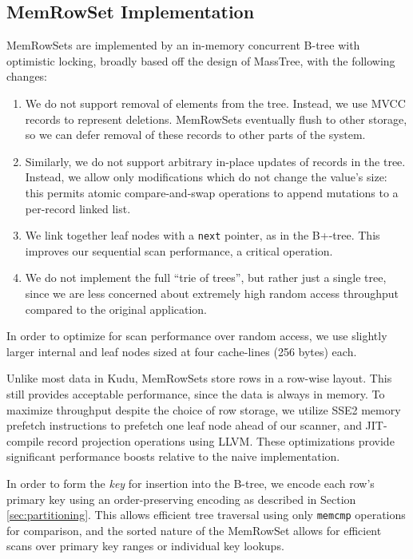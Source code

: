 \documentclass[twocolumn,9pt]{article}
\begin{document}
\subsection{MemRowSet Implementation}

MemRowSets are implemented by an in-memory concurrent B-tree with optimistic
locking, broadly based off the design of MassTree\cite{masstree}, with the following
changes:
\begin{enumerate}
\item We do not support removal of elements from the tree. Instead, we use MVCC
  records to represent deletions. MemRowSets eventually flush to other storage,
  so we can defer removal of these records to other parts of the system.
\item Similarly, we do not support arbitrary in-place updates of records in the tree.
  Instead, we allow only modifications which do not change the value's size:
  this permits atomic compare-and-swap operations to append mutations to a
  per-record linked list.
\item We link together leaf nodes with a {\tt next} pointer, as in the B+-tree\cite{bplus_tree}.
  This improves our sequential scan performance, a critical operation.
\item We do not implement the full ``trie of trees'', but rather just a single
  tree, since we are less concerned about extremely high random access throughput
  compared to the original application.
\end{enumerate}

In order to optimize for scan performance over random access, we use slightly larger internal and
leaf nodes sized at four cache-lines (256 bytes) each.

Unlike most data in Kudu, MemRowSets store rows in a row-wise layout. This still
provides acceptable performance, since the data is always in memory. To maximize
throughput despite the choice of row storage, we utilize
SSE2 memory prefetch instructions to prefetch one leaf node ahead of our scanner,
and JIT-compile record projection operations using LLVM\cite{llvm}.
These optimizations provide significant performance boosts relative to the
naive implementation.

In order to form the {\em key} for insertion into the B-tree, we encode
each row's primary key using an order-preserving encoding as described in
Section \ref{sec:partitioning}. This allows efficient tree traversal using
only {\tt memcmp} operations for comparison, and the sorted nature of the
MemRowSet allows for efficient scans over primary key ranges or individual
key lookups.
\end{document}
